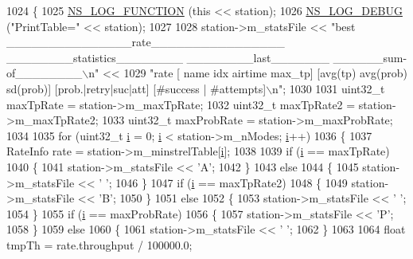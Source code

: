 \begin{DoxyCode}
1024 \{
1025   \hyperlink{log-macros-disabled_8h_a90b90d5bad1f39cb1b64923ea94c0761}{NS\_LOG\_FUNCTION} (\textcolor{keyword}{this} << station);
1026   \hyperlink{group__logging_ga413f1886406d49f59a6a0a89b77b4d0a}{NS\_LOG\_DEBUG} (\textcolor{stringliteral}{"PrintTable="} << station);
1027 
1028   station->m\_statsFile << \textcolor{stringliteral}{"best   \_\_\_\_\_\_\_\_\_\_\_\_\_\_\_rate\_\_\_\_\_\_\_\_\_\_\_\_\_\_\_\_    \_\_\_\_\_\_\_\_statistics\_\_\_\_\_\_\_\_   
       \_\_\_\_\_\_\_\_last\_\_\_\_\_\_\_    \_\_\_\_\_\_sum-of\_\_\_\_\_\_\_\_\(\backslash\)n"} <<
1029     \textcolor{stringliteral}{"rate  [      name       idx airtime max\_tp]  [avg(tp) avg(prob) sd(prob)]  [prob.|retry|suc|att] 
       [#success | #attempts]\(\backslash\)n"};
1030 
1031   uint32\_t maxTpRate = station->m\_maxTpRate;
1032   uint32\_t maxTpRate2 = station->m\_maxTpRate2;
1033   uint32\_t maxProbRate = station->m\_maxProbRate;
1034 
1035   \textcolor{keywordflow}{for} (uint32\_t \hyperlink{bernuolliDistribution_8m_a6f6ccfcf58b31cb6412107d9d5281426}{i} = 0; \hyperlink{bernuolliDistribution_8m_a6f6ccfcf58b31cb6412107d9d5281426}{i} < station->m\_nModes; \hyperlink{bernuolliDistribution_8m_a6f6ccfcf58b31cb6412107d9d5281426}{i}++)
1036     \{
1037       RateInfo rate = station->m\_minstrelTable[\hyperlink{bernuolliDistribution_8m_a6f6ccfcf58b31cb6412107d9d5281426}{i}];
1038 
1039       \textcolor{keywordflow}{if} (\hyperlink{bernuolliDistribution_8m_a6f6ccfcf58b31cb6412107d9d5281426}{i} == maxTpRate)
1040         \{
1041           station->m\_statsFile << \textcolor{charliteral}{'A'};
1042         \}
1043       \textcolor{keywordflow}{else}
1044         \{
1045           station->m\_statsFile << \textcolor{charliteral}{' '};
1046         \}
1047       \textcolor{keywordflow}{if} (\hyperlink{bernuolliDistribution_8m_a6f6ccfcf58b31cb6412107d9d5281426}{i} == maxTpRate2)
1048         \{
1049           station->m\_statsFile << \textcolor{charliteral}{'B'};
1050         \}
1051       \textcolor{keywordflow}{else}
1052         \{
1053           station->m\_statsFile << \textcolor{charliteral}{' '};
1054         \}
1055       \textcolor{keywordflow}{if} (\hyperlink{bernuolliDistribution_8m_a6f6ccfcf58b31cb6412107d9d5281426}{i} == maxProbRate)
1056         \{
1057           station->m\_statsFile << \textcolor{charliteral}{'P'};
1058         \}
1059       \textcolor{keywordflow}{else}
1060         \{
1061           station->m\_statsFile << \textcolor{charliteral}{' '};
1062         \}
1063 
1064       \textcolor{keywordtype}{float} tmpTh = rate.throughput / 100000.0;

\end{DoxyCode}
